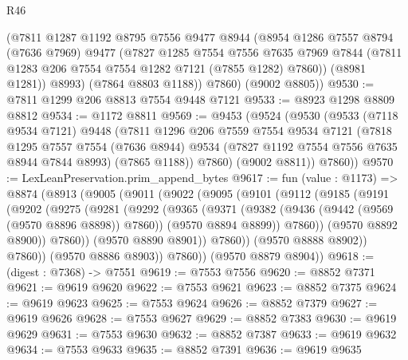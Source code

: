 \begin{lexlean}{R46}
\begin{coremodule}
          (@7811
            @1287
            @1192
            @8795
            @7556
            @9477
            @8944
            (@8954
              @1286
              @7557
              @8794
              (@7636 @7969)
              @9477
              (@7827
                @1285
                @7554
                @7556
                @7635
                @7969
                @7844
                (@7811 @1283 @206 @7554 @7554 @1282 @7121 (@7855 @1282) @7860))
              (@8981 @1281))
            @8993)
          (@7864 @8803 @1188))
        @7860)
      (@9002 @8805))
@9530 := @7811 @1299 @206 @8813 @7554 @9448 @7121
@9533 := @8923 @1298 @8809 @8812
@9534 := @1172 @8811
@9569 := @9453
    (@9524
      (@9530
        (@9533
          (@7118 @9534 @7121)
          @9448
          (@7811
            @1296
            @206
            @7559
            @7554
            @9534
            @7121
            (@7818
              @1295
              @7557
              @7554
              (@7636 @8944)
              @9534
              (@7827 @1192 @7554 @7556 @7635 @8944 @7844 @8993)
              (@7865 @1188))
            @7860)
          (@9002 @8811))
        @7860))
@9570 := LexLeanPreservation.prim_append_bytes
@9617 := fun (value : @1173) =>
  @8874
    (@8913
      (@9005
        (@9011
          (@9022
            (@9095
              (@9101
                (@9112
                  (@9185
                    (@9191
                      (@9202
                        (@9275
                          (@9281
                            (@9292
                              (@9365
                                (@9371
                                  (@9382
                                    (@9436 (@9442 (@9569 (@9570 @8896 @8898)) @7860))
                                    (@9570 @8894 @8899))
                                  @7860))
                              (@9570 @8892 @8900))
                            @7860))
                        (@9570 @8890 @8901))
                      @7860))
                  (@9570 @8888 @8902))
                @7860))
            (@9570 @8886 @8903))
          @7860))
      (@9570 @8879 @8904))
@9618 := (digest : @7368) -> @7551
@9619 := @7553 @7556
@9620 := @8852 @7371
@9621 := @9619 @9620
@9622 := @7553 @9621
@9623 := @8852 @7375
@9624 := @9619 @9623
@9625 := @7553 @9624
@9626 := @8852 @7379
@9627 := @9619 @9626
@9628 := @7553 @9627
@9629 := @8852 @7383
@9630 := @9619 @9629
@9631 := @7553 @9630
@9632 := @8852 @7387
@9633 := @9619 @9632
@9634 := @7553 @9633
@9635 := @8852 @7391
@9636 := @9619 @9635

\end{coremodule}
\end{lexlean}
